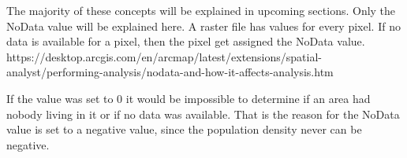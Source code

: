 The majority of these concepts will be explained in upcoming sections. Only the NoData value will be explained here. A raster file has values for every pixel. If no data is available for a pixel, then the pixel get assigned the NoData value. 
https://desktop.arcgis.com/en/arcmap/latest/extensions/spatial-analyst/performing-analysis/nodata-and-how-it-affects-analysis.htm

If the value was set to 0 it would be impossible to determine if an area had nobody living in it or if no data was available. That is the reason for the NoData value is set to a negative value, since the population density never can be negative.



